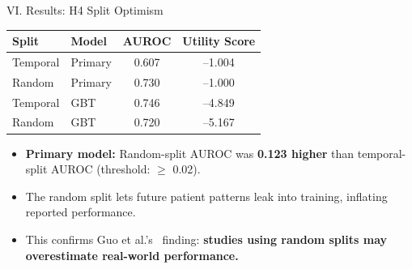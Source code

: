 \begin{frame}{VI. Results: H4 Split Optimism \confirmed}
\begin{center}\tablestyle
\begin{tabular}{llcc}
\toprule
\textbf{Split} & \textbf{Model} & \textbf{AUROC} & \textbf{Utility Score} \\
\midrule
Temporal & Primary & 0.607 & --1.004 \\
Random   & Primary & 0.730 & --1.000 \\
Temporal & GBT     & 0.746 & --4.849 \\
Random   & GBT     & 0.720 & --5.167 \\
\bottomrule
\end{tabular}
\end{center}

\vspace{6pt}
\begin{itemize}
  \item \textbf{Primary model:} Random-split AUROC was \textbf{0.123 higher}
        than temporal-split AUROC (threshold: $\geq$ 0.02).
  \item The random split lets future patient patterns leak into training,
        inflating reported performance.
  \item This confirms Guo et al.'s~\cite{guo2022temporal} finding:
        \textbf{studies using random splits may overestimate real-world
        performance.}
\end{itemize}
\end{frame}


